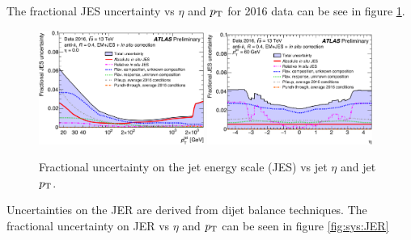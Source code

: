 
\indent The fractional JES uncertainty vs $\eta$ and $p_{\mathrm{T}}$ for 2016 data can be see in figure \ref{fig:sys:JES}. \\

\begin{figure}[!htbp]
\begin{center}
\includegraphics[width=0.48\textwidth]{figures/JetCalib/JES_pt.png}
\includegraphics[width=0.48\textwidth]{figures/JetCalib/JES_eta.png}
\caption{Fractional uncertainty on the jet energy scale (JES) vs jet $\eta$ and jet $p_{\mathrm{T}}$.  }
\label{fig:sys:JES}
\end{center}
\end{figure}

\indent Uncertainties on the JER are derived from dijet balance techniques.\cite{JES_dijet}  The fractional uncertainty on JER vs $\eta$ and $p_{\mathrm{T}}$ can be seen in figure \ref{fig:sys:JER}\\


